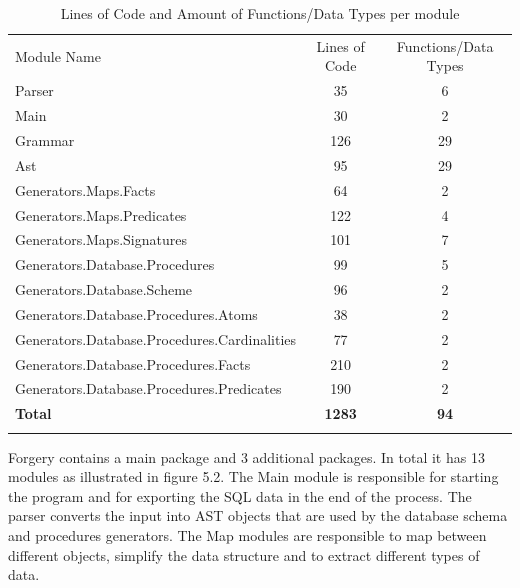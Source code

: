 \documentclass[oneside]{book}
\renewcommand\arraystretch{1.3}
\begin{document}
\def\arraystretch{1.5}%
\begin{table}[h!]
  \label{tab:table1}
  \begin{tabular}{|l||c|c|}
  \hhline{-|-|-|}
    Module Name & Lines of Code & Functions/Data Types \\
    \hhline{|=|=|=|}
    Parser & 35 & 6 \\
    \hhline{-|-|-|}
    Main & 30 & 2 \\
    \hhline{-|-|-|}
    Grammar & 126 & 29 \\
    \hhline{-|-|-|}
    Ast & 95 & 29 \\
    \hhline{-|-|-|}
    Generators.Maps.Facts & 64 & 2 \\
    \hhline{-|-|-|}
    Generators.Maps.Predicates & 122 & 4 \\
    \hhline{-|-|-|}
    Generators.Maps.Signatures & 101 & 7 \\
    \hhline{-|-|-|}
    Generators.Database.Procedures & 99 & 5 \\
    \hhline{-|-|-|}
    Generators.Database.Scheme & 96 & 2 \\
    \hhline{-|-|-|}
    Generators.Database.Procedures.Atoms & 38 & 2 \\
    \hhline{-|-|-|}
    Generators.Database.Procedures.Cardinalities & 77 & 2 \\
    \hhline{-|-|-|}
    Generators.Database.Procedures.Facts & 210 & 2 \\
    \hhline{-|-|-|}
    Generators.Database.Procedures.Predicates & 190 & 2 \\
     \hhline{-|-|-|}
    \textbf{Total} & \textbf{1283} & \textbf{94} \\
    \hhline{-|-|-|}
  \end{tabular}
  \centering
  \caption{Lines of Code and Amount of Functions/Data Types per module}
\end{table}

\newpage

Forgery contains a main package and 3 additional packages. In total it has 13 modules as illustrated in figure 5.2. The Main module is responsible for starting the program and for exporting the SQL data in the end of the process. The parser converts the input into AST objects that are used by the database schema and procedures generators. The Map modules are responsible to map between different objects, simplify the data structure and to extract different types of data.
\end{document}
